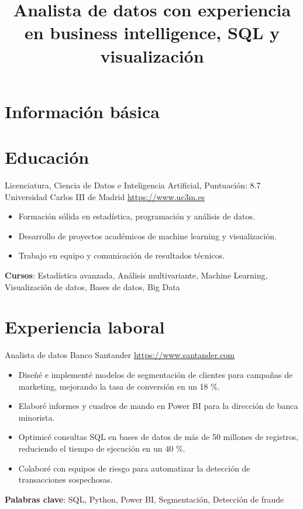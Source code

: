 \documentclass[a4paper, serif, 10pt]{moderncv}
\title{Analista de datos con experiencia en business intelligence, SQL y visualización}
\begin{document}
\maketitle

\section{Información básica}

\section{Educación}

        {Licenciatura, Ciencia de Datos e Inteligencia Artificial, Puntuación: 8.7}
        {Universidad Carlos III de Madrid}
        {\url{https://www.uc3m.es}}
        {}
        {\begin{itemize}
\item Formación sólida en estadística, programación y análisis de datos.
\item Desarrollo de proyectos académicos de machine learning y visualización.
\item Trabajo en equipo y comunicación de resultados técnicos.
\end{itemize}
\textbf{Cursos}: Estadística avanzada, Análisis multivariante, Machine Learning, Visualización de datos, Bases de datos, Big Data}
\section{Experiencia laboral}

        {Analista de datos}
        {Banco Santander}
        {\url{https://www.santander.com}}
        {}
        {\begin{itemize}
\item Diseñé e implementé modelos de segmentación de clientes para campañas de marketing, mejorando la tasa de conversión en un 18 \%.
\item Elaboré informes y cuadros de mando en Power BI para la dirección de banca minorista.
\item Optimicé consultas SQL en bases de datos de más de 50 millones de registros, reduciendo el tiempo de ejecución en un 40 \%.
\item Colaboré con equipos de riesgo para automatizar la detección de transacciones sospechosas.
\end{itemize}
\textbf{Palabras clave}: SQL, Python, Power BI, Segmentación, Detección de fraude}
\end{document}
